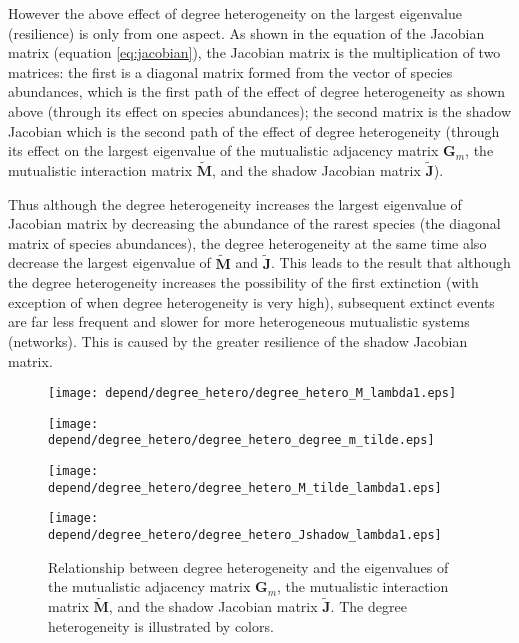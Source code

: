 \documentclass[a4paper,fleqn,12pt]{article}
\begin{document}
However the above effect of degree heterogeneity on the largest eigenvalue (resilience) is only from one aspect.
As shown in the equation of the Jacobian matrix (equation \ref{eq:jacobian}),
the Jacobian matrix is the multiplication of two matrices:
the first is a diagonal matrix formed from the vector of species abundances, which is the first path of the effect of degree heterogeneity as shown above (through its effect on species abundances); the second matrix is the shadow Jacobian which is the second path of the effect of degree heterogeneity (through its effect on the largest eigenvalue of the mutualistic adjacency matrix $\mathbf{G}_m$, the mutualistic interaction matrix $\widetilde{\mathbf{M}}$, and the shadow Jacobian matrix $\widetilde{\mathbf{J}}$).

Thus although the degree heterogeneity increases the largest eigenvalue of Jacobian matrix by decreasing the abundance of the rarest species (the diagonal matrix of species abundances),
the degree heterogeneity at the same time also decrease the largest eigenvalue of $\widetilde{\mathbf{M}}$ and $\widetilde{\mathbf{J}}$. This leads to the result that 
although the degree heterogeneity increases the possibility of the first extinction (with exception of when degree heterogeneity is very high),
subsequent extinct events are far less frequent and slower for more heterogeneous mutualistic systems (networks). This is caused by the greater resilience of the shadow Jacobian matrix.

\begin{figure}[htbp]
\begin{minipage}{0.4\linewidth}
  \texttt{[image: depend/degree\_hetero/degree\_hetero\_M\_lambda1.eps]}
\end{minipage}
\hfill
\begin{minipage}{0.4\linewidth}
  \texttt{[image: depend/degree\_hetero/degree\_hetero\_degree\_m\_tilde.eps]}
\end{minipage}
\vfill
\begin{minipage}{0.4\linewidth}
  \texttt{[image: depend/degree\_hetero/degree\_hetero\_M\_tilde\_lambda1.eps]}
\end{minipage}
\hfill
\begin{minipage}{0.4\linewidth}
  \texttt{[image: depend/degree\_hetero/degree\_hetero\_Jshadow\_lambda1.eps]}
\end{minipage}
\caption{Relationship between degree heterogeneity and the eigenvalues of the mutualistic adjacency matrix $\mathbf{G}_m$, the mutualistic interaction matrix $\widetilde{\mathbf{M}}$, and the shadow Jacobian matrix $\widetilde{\mathbf{J}}$.
The degree heterogeneity is illustrated by colors.}
\label{fig:degree-hetero-Jshadow-lambda1}
\end{figure}
\end{document}
